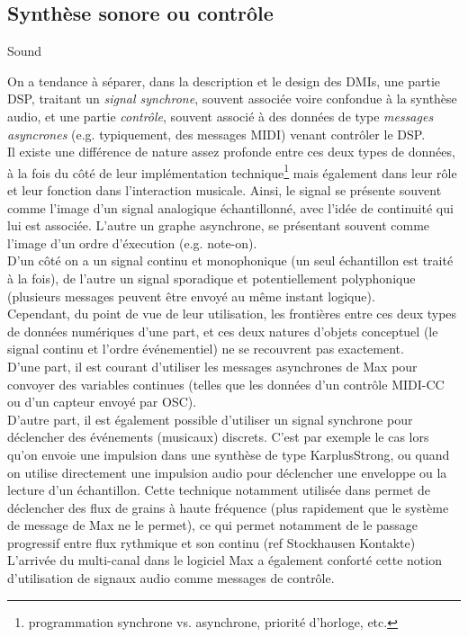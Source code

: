 
\subsection{Synthèse sonore ou contrôle}

Sound  \cite{di_scipio_sound_2003}

\noindent On a tendance à séparer, dans la description et le design des \glspl{DMI}, une partie \gls{DSP}, traitant un \textit{signal synchrone}, souvent associée voire confondue à la synthèse audio, et une partie \textit{contrôle}, souvent associé à des données de type \textit{messages asyncrones} (e.g. typiquement, des messages \gls{MIDI}) venant contrôler le \gls{DSP}.\\
\indent Il existe une différence de nature assez profonde entre ces deux types de données, à la fois du côté de leur implémentation technique\footnote{programmation synchrone vs. asynchrone, priorité d'horloge, etc.} mais également dans leur rôle et leur fonction dans l'interaction musicale. Ainsi, le signal se présente souvent comme l'image d'un signal analogique échantillonné, avec l'idée de continuité qui lui est associée. L'autre un graphe asynchrone, se présentant souvent comme l'image d'un ordre d'éxecution (e.g. note-on). \\
\indent D'un côté on a un signal continu et monophonique (un seul échantillon est traité à la fois), de l'autre un signal sporadique et potentiellement polyphonique (plusieurs messages peuvent être envoyé au même instant logique).\\
\indent Cependant, du point de vue de leur utilisation, les frontières entre ces deux types de données numériques d'une part, et ces deux natures d'objets conceptuel (le signal continu et l'ordre événementiel) ne se recouvrent pas exactement. \\
\indent D'une part, il est courant d'utiliser les messages asynchrones de Max pour convoyer des variables continues (telles que les données d'un contrôle MIDI-CC ou d'un capteur envoyé par \gls{OSC}).\\
\indent D'autre part, il est également possible d'utiliser un signal synchrone pour déclencher des événements (musicaux) discrets. C'est par exemple le cas lors qu'on envoie une impulsion dans une synthèse de type \gls{KarplusStrong}, ou quand on utilise directement une impulsion audio pour déclencher une enveloppe ou la lecture d'un échantillon.
Cette technique notamment utilisée dans \cite{bascou_gmu_2005} permet de déclencher des flux de grains à haute fréquence (plus rapidement que le système de message de Max ne le permet), ce qui permet notamment de le passage progressif entre flux rythmique et son continu (ref Stockhausen Kontakte)\\
\indent L'arrivée du multi-canal dans le logiciel Max a également conforté cette notion d'utilisation de signaux audio comme messages de contrôle.

